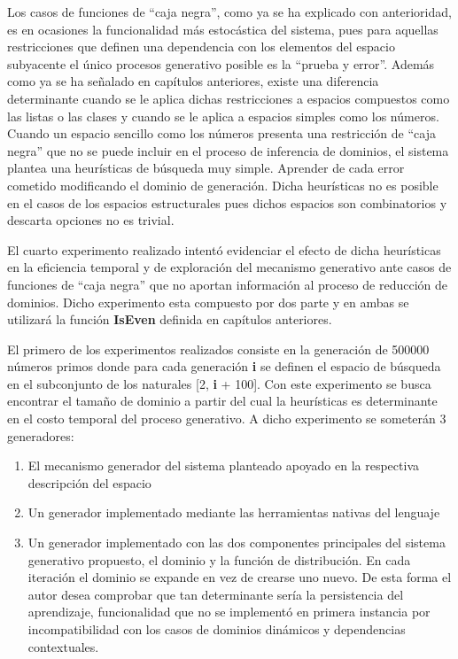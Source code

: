 Los casos de funciones de “caja negra”, como ya se ha explicado con anterioridad, es en ocasiones la
funcionalidad más estocástica del sistema, pues para aquellas restricciones que definen una dependencia
con los elementos del espacio subyacente el único procesos generativo posible es la “prueba y error”.
Además como ya se ha señalado en capítulos anteriores, existe una diferencia determinante cuando se le
aplica dichas restricciones a espacios compuestos como las listas o las clases y cuando se le aplica a
espacios simples como los números. Cuando un espacio sencillo como los números presenta una restricción
de “caja negra” que no se puede incluir en el proceso de inferencia de dominios, el sistema plantea una
heurísticas de búsqueda muy simple. Aprender de cada error cometido modificando el dominio de generación.
Dicha heurísticas no es posible en el casos de los espacios estructurales pues dichos espacios son
combinatorios y descarta opciones no es trivial.

El cuarto experimento realizado intentó evidenciar el efecto de dicha heurísticas en la eficiencia temporal
y de exploración del mecanismo generativo ante casos de funciones de ``caja negra'' que no aportan información
al proceso de reducción de dominios. Dicho experimento esta compuesto por dos parte y en ambas se utilizará
la función {\bf IsEven} definida en capítulos anteriores.

El primero de los experimentos realizados consiste en la generación de 500000 números primos donde para cada
generación {\bf i} se definen el espacio de búsqueda en el subconjunto de los naturales [2, {\bf i} + 100]. Con este
experimento se busca encontrar el tamaño de dominio a partir del cual la heurísticas es determinante en el
costo temporal del proceso generativo. A dicho experimento se someterán 3 generadores:
\begin{enumerate}

      \item  El mecanismo generador del sistema planteado apoyado en la respectiva descripción del espacio
      \item  Un generador implementado mediante las herramientas nativas del lenguaje
      \item  Un generador implementado con las dos componentes principales del sistema generativo propuesto, el
            dominio y la función de distribución. En cada iteración el dominio se expande en vez
            de crearse uno nuevo. De esta forma el autor desea comprobar que tan determinante sería la persistencia del
            aprendizaje, funcionalidad que no se implementó en primera instancia por incompatibilidad con los casos de
            dominios dinámicos y dependencias contextuales.
\end{enumerate}

